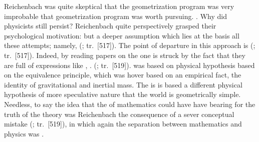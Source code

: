 \documentclass[draft]{article}
\renewcommand{\rzlap}[2]{(\cite[#1]{Reichenbach1928}; tr.\ [#2])\xspace}
\begin{document}
Reichenbach was quite skeptical that the geometrization program was very improbable that geometrization program was worth pursuing. . Why did physicists still persist? Reichenbach quite perspectively grasped their psychological motivation:  but a deeper assumption which lies at the basis all these attempts; namely,  \rzlap{370}{517}. The point of departure in this approach is  \rzlap{370}{517}. Indeed, by reading papers on the \uft one is struck by the fact that they are full of expressions like , \etc.  \rzlap{372}{519}. \Gr was based on physical hypothesis based on the equivalence principle, which was hover based on an empirical fact, the identity of gravitational and inertial mass. The \uftp is is based a different physical hypothesis of more speculative nature that the world is geometrically simple. Needless, to say the idea that the  of mathematics could have have bearing for the truth of the theory was Reichenbach the consequence of a sever conceptual mistake \rzlap{372}{519}, in which again the separation between mathematics and physics was .


\end{document}
